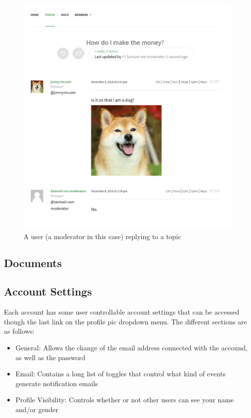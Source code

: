 \documentclass[10pt]{article}
\begin{document}
\begin{figure}[H]
    \centering
    \includegraphics[scale=0.4]{images/nodoggo.jpg}
    \caption{A user (a moderator in this case) replying to a topic}
    \label{nodoggo}
\end{figure}


\subsection{Documents}

\subsection{Account Settings}
\begin{flushleft}
Each account has some user controllable account settings that can be accessed though the last link on the profile pic dropdown menu.  The different sections are as follows:
\end{flushleft}


\begin{itemize}
    \item General:  Allows the change of the email address connected with the accound, as well as the password
    \item Email: Contains a long list of toggles that control what kind of events generate notification emails
    \item Profile Visibility: Controls whether or not other users can see your name and/or gender
\end{itemize}
\end{document}
